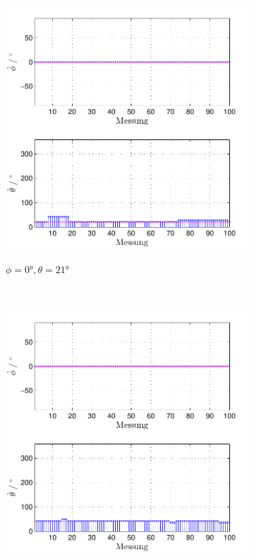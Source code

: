 \begin{figure}
        \centering
        \begin{subfigure}[b]{0.48\textwidth}
                \centering
                \includegraphics[width=\textwidth]{grafiken/04_Echtzeitversuch/MALE_Phi_0_Theta_21}
                \label{fig:Foto_DSP_Draufsicht_Seitanansicht}
                \caption{$\phi=0°, \theta = 21°$}
        \end{subfigure}
        ~ %
        \begin{subfigure}[b]{0.48\textwidth}
                \centering
                \includegraphics[width=\textwidth]{grafiken/04_Echtzeitversuch/MALE_Phi_0_Theta_42}

\end{subfigure}
\end{figure}
